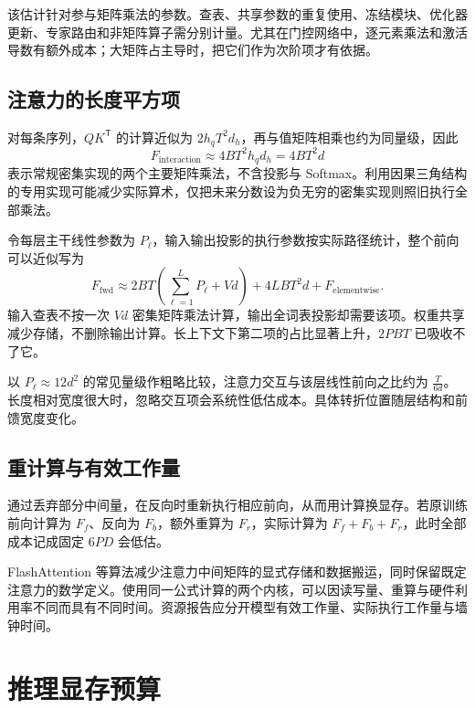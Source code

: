 \documentclass[../textbook.tex]{subfiles}
\begin{document}
该估计针对参与矩阵乘法的参数。查表、共享参数的重复使用、冻结模块、优化器更新、专家路由和非矩阵算子需分别计量。尤其在门控网络中，逐元素乘法和激活导数有额外成本；大矩阵占主导时，把它们作为次阶项才有依据。

\subsection{注意力的长度平方项}
对每条序列，$QK^{\mathsf T}$ 的计算近似为 $2h_qT^2d_h$，再与值矩阵相乘也约为同量级，因此
\begin{equation}\label{eq:budget-attn-flops}
 F_{\mathrm{interaction}}\approx4BT^2h_qd_h=4BT^2d
\end{equation}
表示常规密集实现的两个主要矩阵乘法，不含投影与 Softmax。利用因果三角结构的专用实现可能减少实际算术，仅把未来分数设为负无穷的密集实现则照旧执行全部乘法。

令每层主干线性参数为 $P_\ell$，输入输出投影的执行参数按实际路径统计，整个前向可以近似写为
\begin{equation}
 F_{\mathrm{fwd}}\approx2BT\left(\sum_{\ell=1}^{L}P_\ell+Vd\right)
 +4LBT^2d+F_{\mathrm{elementwise}}.
\end{equation}
输入查表不按一次 $Vd$ 密集矩阵乘法计算，输出全词表投影却需要该项。权重共享减少存储，不删除输出计算。长上下文下第二项的占比显著上升，$2PBT$ 已吸收不了它。

以 $P_\ell\approx12d^2$ 的常见量级作粗略比较，注意力交互与该层线性前向之比约为 $\frac{T}{6d}$。长度相对宽度很大时，忽略交互项会系统性低估成本。具体转折位置随层结构和前馈宽度变化。

\subsection{重计算与有效工作量}
通过丢弃部分中间量，在反向时重新执行相应前向，从而用计算换显存。若原训练前向计算为 $F_f$、反向为 $F_b$，额外重算为 $F_r$，实际计算为 $F_f+F_b+F_r$，此时全部成本记成固定 $6PD$ 会低估。

FlashAttention 等算法减少注意力中间矩阵的显式存储和数据搬运\cite{dao2022flashattention}，同时保留既定注意力的数学定义。使用同一公式计算的两个内核，可以因读写量、重算与硬件利用率不同而具有不同时间。资源报告应分开模型有效工作量、实际执行工作量与墙钟时间。

\section{推理显存预算}
\end{document}
